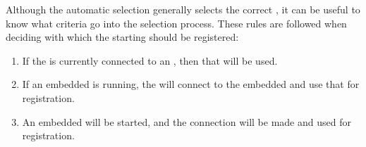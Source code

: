 Although the automatic \gdagent{} selection generally selects the correct
\gdagent{}, it can be useful to know what criteria go into the selection 
process. These rules are followed when deciding with which \gdagent{} the 
starting \gdaut{} should be registered:
\begin{enumerate}
\item{If the \ite{} is currently connected to an \gdagent{}, then that 
	  \gdagent{} will be used.}
\item{If an embedded \gdagent{} is running, the \ite{} will connect to the embedded \gdagent{} and use that for \gdaut{} registration.}
\item{An embedded \gdagent{} will be started, and the connection will be made and used for \gdaut{} registration.}
\end{enumerate}
